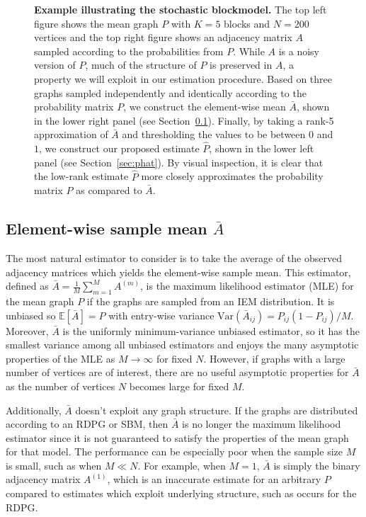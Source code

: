 \documentclass[10pt,letterpaper]{article}
\newcommand{\Ex}{\mathbb{E}}
\renewcommand{\hat}{\widehat}
\begin{document}
\begin{figure}
\begin{subfigure}{.4\textwidth}
\end{subfigure}
\caption{{\bf Example illustrating the stochastic blockmodel.}
The top left figure shows the mean graph $P$ with $K = 5$ blocks and $N=200$ vertices and the top right figure shows an adjacency matrix $A$ sampled according to the probabilities from $P$.
While $A$ is a noisy version of $P$, much of the structure of $P$ is preserved in $A$, a property we will exploit in our estimation procedure.
Based on three graphs sampled independently and identically according to the probability matrix $P$, we construct the element-wise mean $\bar{A}$, shown in the lower right panel (see Section~\ref{sec:abar}).  
Finally, by taking a rank-5 approximation of $\bar{A}$ and thresholding the values to be between $0$ and $1$, we construct our proposed estimate $\hat{P}$, shown in the lower left panel (see Section~\ref{sec:phat}).
By visual inspection, it is clear that the low-rank estimate $\hat{P}$ more closely approximates the probability matrix $P$ as compared to $\bar{A}$.
}
\label{fig:SBM_example}
\end{figure}


\subsection[Element-wise sample mean]{Element-wise sample mean $\bar{A}$}
\label{sec:abar}
The most natural estimator to consider is to take the average of the observed adjacency matrices which yields the element-wise sample mean.
This estimator, defined as $\bar{A}=\frac{1}{M}\sum_{m=1}^M A^{(m)}$, is the  maximum likelihood estimator (MLE) for the mean graph $P$ if the graphs are sampled from an IEM distribution.
It is unbiased so $\Ex[\bar{A}]=P$ with entry-wise variance $\mathrm{Var}(\bar{A}_{ij}) = P_{ij} (1-P_{ij})/M$. Moreover, $\bar{A}$ is the uniformly minimum-variance unbiased estimator, so it has the smallest variance among all unbiased estimators and enjoys the many asymptotic properties of the MLE as $M\to \infty$ for fixed $N$.
However, if graphs with a large number of vertices are of interest, there are no useful asymptotic properties for $\bar{A}$ as the number of vertices $N$ becomes large for fixed $M$.

Additionally, $\bar{A}$ doesn't exploit any graph structure.
If the graphs are distributed according to an RDPG or SBM, then $\bar{A}$ is no longer the maximum likelihood estimator since it is not guaranteed to satisfy the properties of the mean graph for that model.
The performance can be especially poor when the sample size $M$ is small, such as when $M\ll N$.
For example, when $M=1$, $\bar{A}$ is simply the binary adjacency matrix $A^{(1)}$, which is an inaccurate estimate for an arbitrary $P$ compared to estimates which exploit underlying structure, such as occurs for the RDPG.
\end{document}
